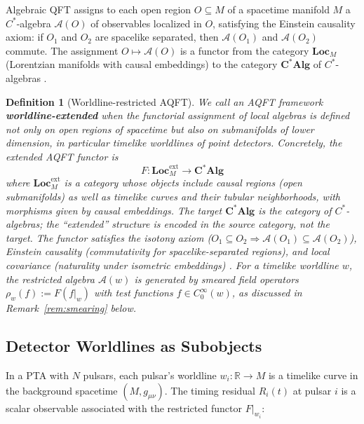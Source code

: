 \documentclass[11pt,a4paper]{article}
\newtheorem{definition}{Definition}[section]
\begin{document}
Algebraic QFT assigns to each open region $O \subseteq M$ of a spacetime manifold $M$ a $C^*$-algebra $\mathcal{A}(O)$ of observables localized in $O$, satisfying the Einstein causality axiom: if $O_1$ and $O_2$ are spacelike separated, then $\mathcal{A}(O_1)$ and $\mathcal{A}(O_2)$ commute. The assignment $O \mapsto \mathcal{A}(O)$ is a functor from the category $\mathbf{Loc}_M$ (Lorentzian manifolds with causal embeddings) to the category $\mathbf{C^*Alg}$ of $C^*$-algebras \cite{Brunetti:2003,Moretti:2017}.

\begin{definition}[Worldline-restricted AQFT]
We call an AQFT framework \textbf{worldline-extended} when the functorial assignment of local algebras is defined not only on open regions of spacetime but also on submanifolds of lower dimension, in particular timelike worldlines of point detectors. Concretely, the extended AQFT functor is
\begin{equation}
F: \mathbf{Loc}_{M}^{\mathrm{ext}} \to \mathbf{C^*Alg}
\end{equation}
where $\mathbf{Loc}_{M}^{\mathrm{ext}}$ is a category whose objects include causal regions (open submanifolds) as well as timelike curves and their tubular neighborhoods, with morphisms given by causal embeddings. The target $\mathbf{C^*Alg}$ is the category of $C^*$-algebras; the ``extended'' structure is encoded in the source category, not the target. The functor satisfies the isotony axiom ($O_1 \subseteq O_2 \Rightarrow \mathcal{A}(O_1) \subseteq \mathcal{A}(O_2)$), Einstein causality (commutativity for spacelike-separated regions), and local covariance (naturality under isometric embeddings) \cite{Brunetti:2003,Moretti:2017}. For a timelike worldline $w$, the restricted algebra $\mathcal{A}(w)$ is generated by smeared field operators $\rho_w(f) := F(f|_w)$ with test functions $f \in C_0^\infty(w)$, as discussed in Remark~\ref{rem:smearing} below.
\end{definition}

\subsection{Detector Worldlines as Subobjects}\label{sec:detectors}

In a PTA with $N$ pulsars, each pulsar's worldline $w_i: \mathbb{R} \to M$ is a timelike curve in the background spacetime $(M, g_{\mu\nu})$. The timing residual $R_i(t)$ at pulsar $i$ is a scalar observable associated with the restricted functor $F|_{w_i}$:
\end{document}
